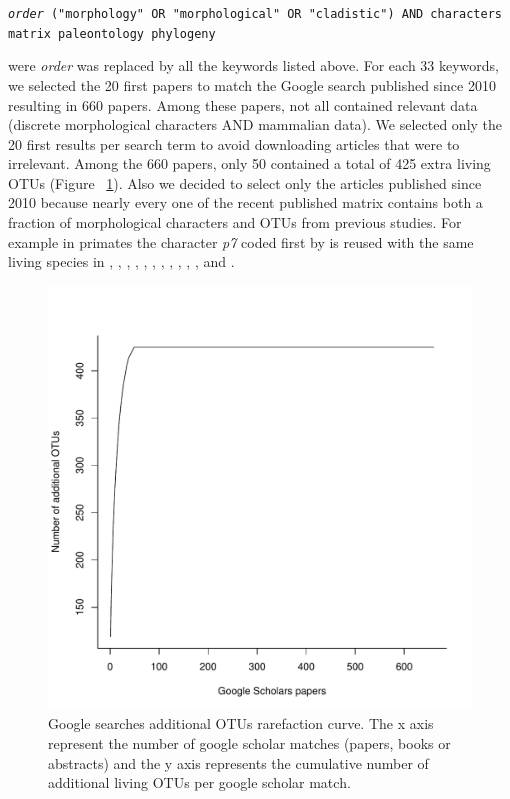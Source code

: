 \texttt{\textit{order} ("morphology" OR "morphological" OR "cladistic") AND characters matrix paleontology phylogeny}

were \textit{order} was replaced by all the keywords listed above. For each 33 keywords, we selected the 20 first papers to match the Google search published since 2010 resulting in 660 papers.
Among these papers, not all contained relevant data (discrete morphological characters AND mammalian data).
We selected only the 20 first results per search term to avoid downloading articles that were to irrelevant. Among the 660 papers, only 50 contained a total of 425 extra living OTUs (Figure ~\ref{Supp_figure_google_searches}).
Also we decided to select only the articles published since 2010 because nearly every one of the recent published matrix contains both a fraction of morphological characters and OTUs from previous studies.
For example in primates the character \textit{p7} coded first by \cite{ross1998phylogenetic} is reused with the same living species in \cite{seiffert2003fossil}, \cite{marivaux2005anthropoid}, \cite{seiffert2005basal}, \cite{bloch2007new}, \cite{bloch2007new}, \cite{kay2008anatomy}, \cite{silcox2008biogeographic}, \cite{seiffert2009convergent}, \cite{tabuce2009anthropoid}, \cite{boyer2010astragalar}, \cite{seiffert2010fossil}, \cite{marivaux2013djebelemur} and \cite{ni2013oldest}.

\begin{figure}[!h]
\centering
    \includegraphics[width=1\textwidth]{Missing_mammals/Figures/Supp_figure_google_searches.pdf}
\caption[Google searches additional OTUs rarefaction curve.]{Google searches additional OTUs rarefaction curve. The x axis represent the number of google scholar matches (papers, books or abstracts) and the y axis represents the cumulative number of additional living OTUs per google scholar match.}
\label{Supp_figure_google_searches}
\end{figure}

